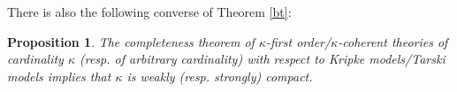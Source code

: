 \documentclass[a4paper,11pt]{article}
\theoremstyle{plain}
\newtheorem{proposition}[thm]{Proposition}
\theoremstyle{plain}
\theoremstyle{remark}
\begin{document}
% 


There is also the following converse of Theorem \ref{bt}:

\begin{proposition}\label{converse}
The completeness theorem of $\kappa$-first order/$\kappa$-coherent theories of cardinality $\kappa$ (resp. of arbitrary cardinality) with respect to Kripke models/Tarski models implies that $\kappa$ is weakly (resp. strongly) compact.
\end{proposition}
\end{document}
